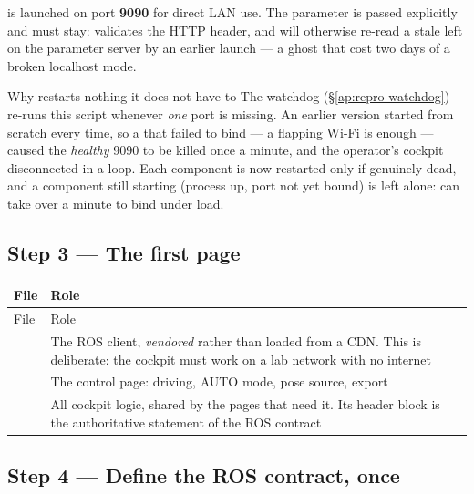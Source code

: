 \noindent {} is launched on port \textbf{9090} for direct LAN
use. The parameter  is passed
explicitly and must stay:  validates the HTTP 
header, and  will otherwise re-read a stale
 left on the parameter server
by an earlier launch --- a ghost that cost two days of a broken localhost
mode.

\begin{trapbox}{Why  restarts nothing it does not have to}
The watchdog (\S\ref{ap:repro-watchdog}) re-runs this script whenever
\emph{one} port is missing. An earlier version started from scratch every
time, so a  that failed to bind --- a flapping Wi-Fi is enough ---
caused the \emph{healthy} 9090  to be killed once a minute,
and the operator's cockpit disconnected in a loop. Each component is now
restarted only if genuinely dead, and a component still starting (process up,
port not yet bound) is left alone:  can take over a minute to
bind under load.
\end{trapbox}

\subsection{Step 3 --- The first page}
\label{ap:repro-web-firstpage}

\begin{longtable}{@{}L{5.3cm}L{8.3cm}@{}}
\toprule
File & Role \\
\midrule
\endfirsthead
\toprule
File & Role \\
\midrule
\endhead
{} \newline {} &
  The ROS client, \emph{vendored} rather than loaded from a CDN. This is
  deliberate: the cockpit must work on a lab network with no internet \\
\addlinespace
{} &
  The control page: driving, AUTO mode, pose source, export \\
\addlinespace
{} &
  All cockpit logic, shared by the pages that need it. Its header block is the
  authoritative statement of the ROS contract \\
\bottomrule
\end{longtable}

\subsection{Step 4 --- Define the ROS contract, once}
\label{ap:repro-web-contract}

